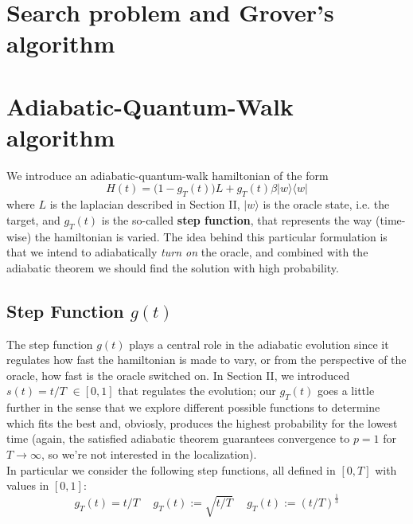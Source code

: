 \documentclass[aps,pra,reprint]{revtex4-2}
\begin{document}
\section{Search problem and Grover's algorithm}


\section{Adiabatic-Quantum-Walk algorithm}

We introduce an adiabatic-quantum-walk hamiltonian of the form
\begin{equation}
    H(t) = \big( 1-g_T(t)\big)L + g_T(t)\beta|w\rangle\langle w|
\end{equation}
where $L$ is the laplacian described in Section II, $|w\rangle$ is the oracle state, i.e. the target, and $g_T(t)$ is the so-called \textbf{step function}, that represents the way (time-wise) the hamiltonian is varied.
The idea behind this particular formulation is that we intend to adiabatically \textit{turn on} the oracle, and combined with the adiabatic theorem we should find the solution with high probability.

\subsection{Step Function $g(t)$}
The step function $g(t)$ plays a central role in the adiabatic evolution since it regulates how fast the hamiltonian is made to vary, or from the perspective of the oracle, how fast is the oracle switched on. In Section II, we introduced $s(t) = t/T$ $\in [0,1]$ that regulates the evolution; our $g_T(t)$ goes a little further in the sense that we explore different possible functions to determine which fits the best and, obviosly, produces the highest probability for the lowest time (again, the satisfied adiabatic theorem guarantees convergence to $p=1$ for $T\to\infty$, so we're not interested in the localization).\\

In particular we consider the following step functions, all defined in $[0,T]$ with values in $[0,1]$:
\begin{equation}
    g_T(t) = t/T \hspace{15pt} g_T(t) := \sqrt{t/T} \hspace{15pt} g_T(t) := (t/T)^{\frac{1}{3}}
\end{equation}
\end{document}
